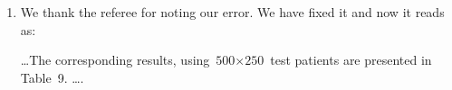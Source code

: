 \begin{enumerate}
\item \textbf{\color{blue}{Supplement P23, l34, 9 should be Table 9.}}
We thank the referee for noting our error. We have fixed it and now it reads as:

\begin{shadequote}
\ldots The corresponding results, using ${\mbox{500} \times \mbox{250}}$ test patients are presented in Table~9. \ldots.
\end{shadequote}

\end{enumerate}

